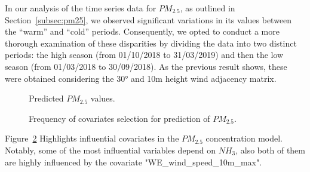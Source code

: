 \documentclass[11pt,a4paper]{article}
\begin{document}
In our analysis of the time series data for $PM_{\text{2.5}}$, as outlined in Section~\ref{subsec:pm25}, we observed significant variations in its values between the ``warm'' and ``cold'' periods. Consequently, we opted to conduct a more thorough examination of these disparities by dividing the data into two distinct periods: the high season (from 01/10/2018 to 31/03/2019) and then the low season (from 01/03/2018 to 30/09/2018). As the previous result shows, these were obtained considering the 30° and 10m height wind adjacency matrix.

\begin{figure}[h]
    \centering
    \hspace{0.5cm}
    \centering
    \caption{Predicted $PM_{2.5}$ values.}
    \label{fig:subfigures}
\end{figure}

\begin{figure}[H]
    \centering
    \hfill
    \caption{Frequency of covariates selection for prediction of $PM_{\text{2.5}}$.}
    \label{fig: Covariates_subfigures}
\end{figure}

Figure~\ref{fig: Covariates_subfigures} Highlights influential covariates in the $PM_{\text{2.5}}$ concentration model. Notably, some of the most influential variables depend on $NH_{3}$, also both of them are highly influenced by the covariate "WE\_wind\_speed\_10m\_max".
\\


\end{document}
